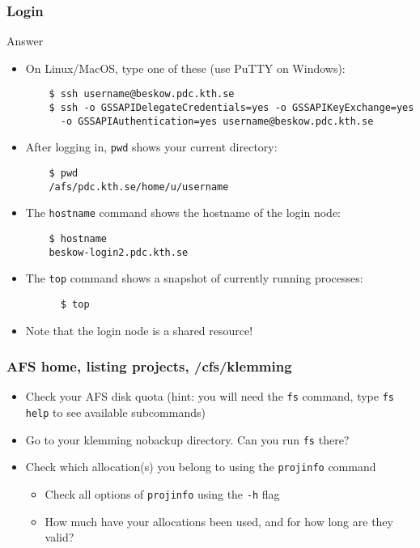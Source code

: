\begin{frame}[fragile]
  \frametitle{Login}
\begin{exampleblock}{{Answer}}
    \verbatimfont{\footnotesize}
    \begin{itemize}
    \item On Linux/MacOS, type one of these (use PuTTY on Windows):
    \begin{verbatim}
    $ ssh username@beskow.pdc.kth.se
    $ ssh -o GSSAPIDelegateCredentials=yes -o GSSAPIKeyExchange=yes 
      -o GSSAPIAuthentication=yes username@beskow.pdc.kth.se
    \end{verbatim}

    \item After logging in, \verb|pwd| shows your current directory:
    \begin{verbatim}
    $ pwd
    /afs/pdc.kth.se/home/u/username
    \end{verbatim}

    \item The \verb|hostname| command shows the hostname of the login node:
    \begin{verbatim}
    $ hostname
    beskow-login2.pdc.kth.se
    \end{verbatim}

    \item The \verb|top| command shows a snapshot of currently running processes:
    \begin{verbatim}
      $ top
    \end{verbatim}

    \item Note that the login node is a shared resource!
    \end{itemize}

\end{exampleblock}
\end{frame}


\begin{frame}[fragile]
  \frametitle{AFS home, listing projects, /cfs/klemming}
\begin{itemize}
  \item Check your AFS disk quota (hint: you will need the \verb|fs| command, type \verb|fs help| to see available subcommands)
  \item Go to your klemming nobackup directory. Can you run \verb|fs| there?
  \item Check which allocation(s) you belong to using the \verb|projinfo| command
    \begin{itemize}
      \item Check all options of \verb|projinfo| using the \verb|-h| flag
      \item How much have your allocations been used, and for how long are they valid?
    \end{itemize}
\end{itemize}
\end{frame}


